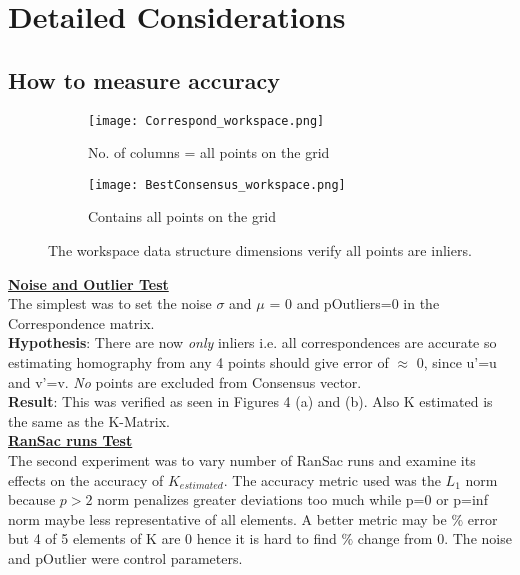 \documentclass[titlepage]{article}
\begin{document}
\section{Detailed Considerations}
\subsection{How to measure accuracy}
\label{Accuracy}
%
\begin{figure}[H]
\begin{subfigure}{0.5\textwidth}
\label{Correspond}
\captionsetup{width=6cm}
\texttt{[image: Correspond\_workspace.png]}
\caption{No. of columns = all points on the grid}
\end{subfigure}
\begin{subfigure}{0.5\textwidth}
\label{Consensus}
\captionsetup{width=6cm}
\texttt{[image: BestConsensus\_workspace.png]}
\caption{Contains all points on the grid}
\end{subfigure}
\caption{The workspace data structure dimensions verify all points are inliers.}
\end{figure}
\textbf{\underline{Noise and Outlier Test}}\\
The simplest was to set the noise $\sigma$ and $\mu$ = 0 and pOutliers=0 in the Correspondence matrix.\\
\textbf{Hypothesis}: There are now \textit{only} inliers i.e. all correspondences are accurate so estimating homography from any 4 points should give error of $\approx$ 0, since u’=u and v’=v. \textit{No} points are excluded from Consensus vector. \\
\textbf{Result}: This was verified as seen in Figures 4 (a) and (b). Also K estimated is the same as the K-Matrix.\\
\textbf{\underline{RanSac runs Test}}\\
The second experiment was to vary number of RanSac runs and examine its effects on the accuracy of $K_{estimated}$. The accuracy metric used was the $L_{1}$ norm because $p > 2$ norm penalizes greater deviations too much while p=0 or p=inf norm maybe less representative of all elements. A better metric may be $\%$ error but 4 of 5 elements of K are 0 hence it is hard to find $\%$ change from 0. The noise and pOutlier were control parameters.\\
\end{document}

